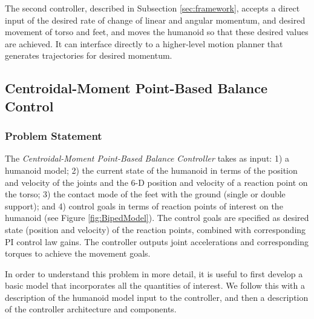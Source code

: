 \documentclass{llncs}
\begin{document}

The second controller, described in Subsection \ref{sec:framework}, accepts a direct input of the desired
rate of change of linear and angular momentum, and desired movement of torso and feet, and moves the 
humanoid so that these desired values are achieved.  It can interface directly to a higher-level
motion planner that generates trajectories for desired momentum.



\subsection{Centroidal-Moment Point-Based Balance Control}
\label{sec:CentroidalMomentPointControl}

\subsubsection{Problem Statement}

The \textit{Centroidal-Moment Point-Based Balance Controller} takes as input:  1) a humanoid
model;  2) the current state of the humanoid in terms of the position and velocity of the joints
and the 6-D position and velocity of a reaction point on the torso;  3) the contact mode of the feet with 
the ground (single or double support);  and 4) control goals in 
terms of reaction points of interest on the humanoid (see Figure \ref{fig:BipedModel}).
The control goals are specified as desired state (position and velocity) of the reaction points,
combined with corresponding PI control law gains.
The controller outputs joint accelerations and corresponding torques to achieve the movement goals.


In order to understand this problem in more detail, it is useful to first develop a basic model that incorporates
all the quantities of interest.  We follow this with a description of the humanoid model input to the controller,
and then a description of the controller architecture and components.
\end{document}
